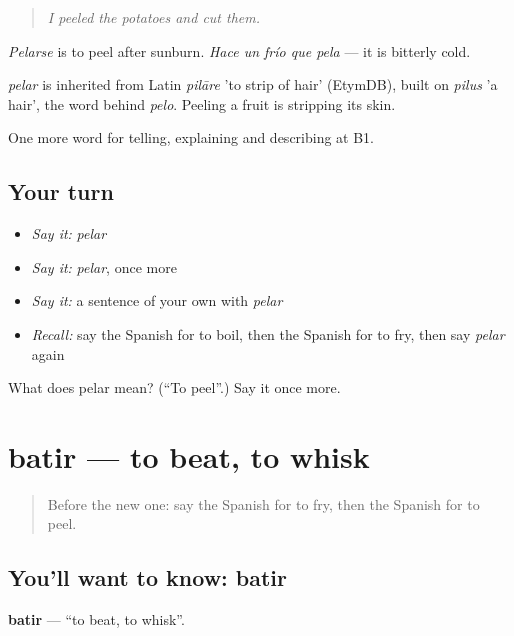 \begin{quote}
\emph{I peeled the potatoes and cut them.}
\end{quote}

\emph{Pelarse} is to peel after sunburn. \emph{Hace un frío que pela} — it is bitterly cold.

\begin{cousinweb}
\emph{pelar} is inherited from Latin \emph{pilāre} 'to strip of hair' (EtymDB), built on \emph{pilus} 'a hair', the word behind \emph{pelo}. Peeling a fruit is stripping its skin.
\end{cousinweb}

\begin{grammarlens}[title={What you've built}]
One more word for telling, explaining and describing at B1.
\end{grammarlens}

\subsection*{Your turn}
\begin{itemize}
\raggedright
  \item \emph{Say it:} \emph{pelar}
  \item \emph{Say it:} \emph{pelar}, once more
  \item \emph{Say it:} a sentence of your own with \emph{pelar}
  \item \emph{Recall:} say the Spanish for to boil, then the Spanish for to fry, then say \emph{pelar} again
\end{itemize}

\begin{tcolorbox}[breakable,colback=teal!4,colframe=teal!35!black,title={Before you move on}]
What does pelar mean? (\textquotedblleft{}To peel\textquotedblright{}.) Say it once more.
\end{tcolorbox}
\section[batir]{batir — to beat, to whisk}

\label{lesson:ES-C768-batir}



\begin{quote}
Before the new one: say the Spanish for to fry, then the Spanish for to peel.
\end{quote}

\subsection*{You'll want to know: batir}
\textbf{batir} — \textquotedblleft{}to beat, to whisk\textquotedblright{}.

